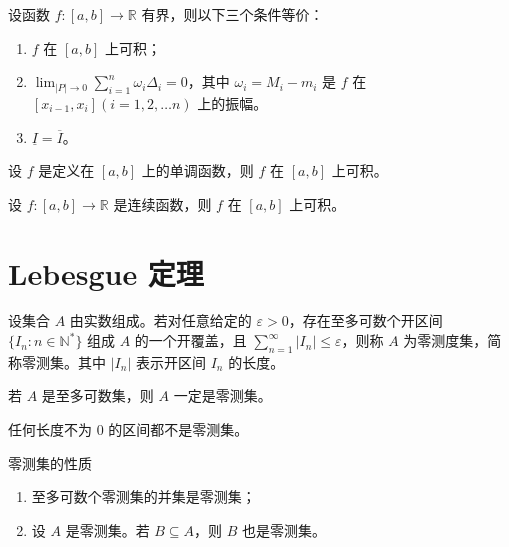 \begin{theorem}
    设函数 $f:[a, b] \to \mathbb{R}$ 有界，则以下三个条件等价：
    \begin{enumerate}
        \item  $f$ 在 $[a, b]$ 上可积；
        \item $\lim_{|P| \to 0}\sum_{i = 1}^{n}\omega_i \Delta_i = 0$，其中 $\omega_i = M_i - m_i$ 是 $f$ 在 $[x_{i - 1},x_i](i = 1,2, \ldots n)$ 上的振幅。
        \item $\underline{I} = \overline{I}$。
    \end{enumerate}
\end{theorem}

\begin{theorem}
    设 $f$ 是定义在 $[a, b]$ 上的单调函数，则 $f$ 在 $[a, b]$ 上可积。
\end{theorem}

\begin{theorem}
    设 $f:[a, b] \to \mathbb{R}$ 是连续函数，则 $f$ 在 $[a, b]$ 上可积。
\end{theorem}


\section{Lebesgue 定理}

\begin{definition}
    设集合 $A$ 由实数组成。若对任意给定的 $\varepsilon > 0$，存在至多可数个开区间 $\{I_n : n \in \mathbb{N}^*\}$ 组成 $A$ 的一个开覆盖，且 $\displaystyle \sum_{n = 1}^{\infty} |I_n| \leqslant \varepsilon$，则称 $A$ 为零测度集，简称零测集。其中 $|I_n|$ 表示开区间 $I_n$ 的长度。
\end{definition}

\hfill

\begin{example}
    若 $A$ 是至多可数集，则 $A$ 一定是零测集。
\end{example}

\hfill

\begin{example}
    任何长度不为 $0$ 的区间都不是零测集。
\end{example}

\hfill

\begin{proposition}{零测集的性质}
    \begin{enumerate}
        \item 至多可数个零测集的并集是零测集；
        \item 设 $A$ 是零测集。若 $B \subseteq A$，则 $B$ 也是零测集。
    \end{enumerate}
\end{proposition}

